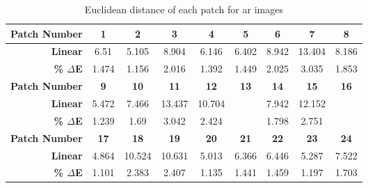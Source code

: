 \begin{table}[H]
  \caption{Euclidean distance of each patch for ar images }
  \begin{center}
    \begin{tabularx}{\textwidth}{r c c c c c c c c}
    \toprule
        \textbf{Patch Number} & \textbf{1} & \textbf{2} & \textbf{3} & \textbf{4} & \textbf{5} & \textbf{6} & \textbf{7} & \textbf{8}\\ \midrule 
        \textbf{Linear} &6.51 &5.105 &8.904 &6.146 &6.402 &8.942 &13.404 &8.186\\ 
        \textbf{\textbf{\% $\Delta$E}} &1.474 &1.156 &2.016 &1.392 &1.449 &2.025 &3.035 &1.853\\ \midrule 
        \textbf{Patch Number} & \textbf{9} & \textbf{10} & \textbf{11} & \textbf{12} & \textbf{13} & \textbf{14} & \textbf{15} & \textbf{16}\\ \midrule 
        \textbf{Linear} &5.472 &7.466 &13.437 &10.704 &\cellcolor{colorgreen}{4.744} &7.942 &12.152 &\cellcolor{colorred}{15.425}\\ 
        \textbf{\textbf{\% $\Delta$E}} &1.239 &1.69 &3.042 &2.424 &\cellcolor{colorgreen}{1.074} &1.798 &2.751 &\cellcolor{colorred}{3.492}\\ \midrule 
        \textbf{Patch Number} & \textbf{17} & \textbf{18} & \textbf{19} & \textbf{20} & \textbf{21} & \textbf{22} & \textbf{23} & \textbf{24}\\ \midrule 
        \textbf{Linear} &4.864 &10.524 &10.631 &5.013 &6.366 &6.446 &5.287 &7.522\\ 
        \textbf{\textbf{\% $\Delta$E}} &1.101 &2.383 &2.407 &1.135 &1.441 &1.459 &1.197 &1.703\\ \midrule 
    \bottomrule
    \end{tabularx}
  \end{center}
\end{table}
